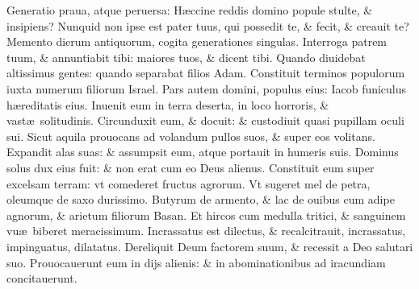 \documentclass[a5paper,10pt]{book}
\def\ae{æ}
\begin{document}
\begin{multicols*}{2}
\newline \color{red} G\color{black}eneratio praua, atque peruersa: H\ae ccine reddis domino popule stulte, \& insipiens?
\newline \color{red} N\color{black}unquid non ipse est pater tuus, qui possedit te, \& fecit, \& creauit te?
\newline \color{red} M\color{black}emento dierum antiquorum, cogita generationes singulas.
\newline \color{red} I\color{black}nterroga patrem tuum, \& annuntiabit tibi: maiores tuos, \& dicent tibi.
\newline \color{red} Q\color{black}uando diuidebat altissimus gentes: quando separabat filios Adam.
\newline \color{red} C\color{black}onstituit terminos populorum iuxta numerum filiorum Israel.
\newline \color{red} P\color{black}ars autem domini, populus eius: Iacob funiculus h\ae reditatis eius.
\newline \color{red} I\color{black}nuenit eum in terra deserta, in loco horroris, \& vast\ae \ solitudinis.
\newline \color{red} C\color{black}ircunduxit eum, \& docuit: \& custodiuit quasi pupillam oculi sui.
\newline \color{red} S\color{black}icut aquila prouocans ad volandum pullos suos, \& super eos volitans.
\newline \color{red} E\color{black}xpandit alas suas: \& assumpsit eum, atque portauit in humeris suis.
\newline \color{red} D\color{black}ominus solus dux eius fuit: \& non erat cum eo Deus alienus.
\newline \color{red} C\color{black}onstituit eum super excelsam terram: vt comederet fructus agrorum.
\newline \color{red} V\color{black}t sugeret mel de petra, oleumque de saxo durissimo.
\newline \color{red} B\color{black}utyrum de armento, \& lac de ouibus cum adipe agnorum, \& arietum filiorum Basan.
\newline \color{red} E\color{black}t hircos cum medulla tritici, \& sanguinem vu\ae \ biberet meracissimum.
\newline \color{red} I\color{black}ncrassatus est dilectus, \& recalcitrauit, incrassatus, impinguatus, dilatatus.
\newline \color{red} D\color{black}ereliquit Deum factorem suum, \& recessit a Deo salutari suo.
\newline \color{red} P\color{black}rouocauerunt eum in dijs alienis: \& in abominationibus ad iracundiam concitauerunt.

\end{multicols*}
\end{document}
